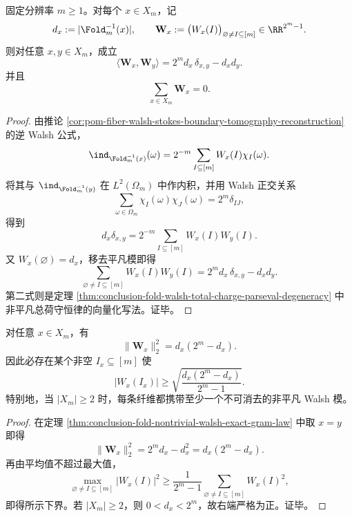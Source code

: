 \begin{theorem}\label{thm:conclusion-fold-nontrivial-walsh-exact-gram-law}
固定分辨率 \(m\ge 1\)。对每个 \(x\in X_m\)，记
\[
d_x:=|\Fold_m^{-1}(x)|,
\qquad
\mathbf W_x:=\bigl(W_x(I)\bigr)_{\varnothing\neq I\subseteq[m]}\in\RR^{2^m-1}.
\]
则对任意 \(x,y\in X_m\)，成立
\[
\langle \mathbf W_x,\mathbf W_y\rangle
=
2^m d_x\,\delta_{x,y}-d_xd_y.
\]
并且
\[
\sum_{x\in X_m}\mathbf W_x=0.
\]
\end{theorem}

\begin{proof}
由推论 \ref{cor:pom-fiber-walsh-stokes-boundary-tomography-reconstruction} 的逆 Walsh 公式，
\[
\ind_{\Fold_m^{-1}(x)}(\omega)
=
2^{-m}\sum_{I\subseteq[m]}W_x(I)\chi_I(\omega).
\]
将其与 \(\ind_{\Fold_m^{-1}(y)}\) 在 \(L^2(\Omega_m)\) 中作内积，并用 Walsh 正交关系
\[
\sum_{\omega\in\Omega_m}\chi_I(\omega)\chi_J(\omega)=2^m\delta_{IJ},
\]
得到
\[
d_x\delta_{x,y}
=
2^{-m}\sum_{I\subseteq[m]}W_x(I)W_y(I).
\]
又 \(W_x(\varnothing)=d_x\)，移去平凡模即得
\[
\sum_{\varnothing\neq I\subseteq[m]}W_x(I)W_y(I)
=
2^m d_x\,\delta_{x,y}-d_xd_y.
\]
第二式则是定理 \ref{thm:conclusion-fold-walsh-total-charge-parseval-degeneracy} 中非平凡总荷守恒律的向量化写法。证毕。
\end{proof}

\begin{corollary}[边界可见能量的精确守恒与不可消去模]\label{cor:conclusion-fold-boundary-visible-energy-nonremovable-mode}
对任意 \(x\in X_m\)，有
\[
\|\mathbf W_x\|_2^2=d_x(2^m-d_x).
\]
因此必存在某个非空 \(I_x\subseteq[m]\) 使
\[
|W_x(I_x)|
\ge
\sqrt{\frac{d_x(2^m-d_x)}{2^m-1}}.
\]
特别地，当 \(|X_m|\ge 2\) 时，每条纤维都携带至少一个不可消去的非平凡 Walsh 模。
\end{corollary}

\begin{proof}
在定理 \ref{thm:conclusion-fold-nontrivial-walsh-exact-gram-law} 中取 \(x=y\) 即得
\[
\|\mathbf W_x\|_2^2=2^m d_x-d_x^2=d_x(2^m-d_x).
\]
再由平均值不超过最大值，
\[
\max_{\varnothing\neq I\subseteq[m]}|W_x(I)|^2
\ge
\frac{1}{2^m-1}\sum_{\varnothing\neq I\subseteq[m]}W_x(I)^2,
\]
即得所示下界。若 \(|X_m|\ge 2\)，则 \(0<d_x<2^m\)，故右端严格为正。证毕。
\end{proof}

